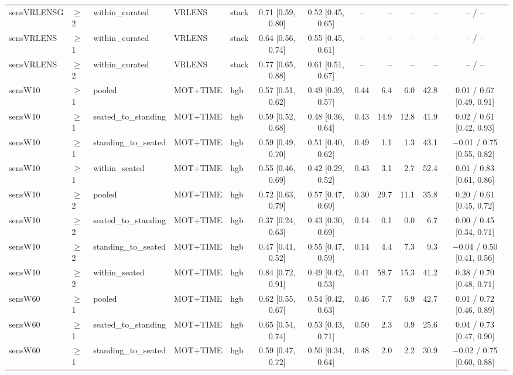 \begin{longtable}{@{}lllllcccrrrc@{}}
sensVRLENSG & $\geq$2 & within\_curated & VRLENS & stack & 0.71 [0.59, 0.80] & 0.52 [0.45, 0.65] & -- & -- & -- & -- & -- / -- \\
sensVRLENS & $\geq$1 & within\_curated & VRLENS & stack & 0.64 [0.56, 0.74] & 0.55 [0.45, 0.61] & -- & -- & -- & -- & -- / -- \\
sensVRLENS & $\geq$2 & within\_curated & VRLENS & stack & 0.77 [0.65, 0.88] & 0.61 [0.51, 0.67] & -- & -- & -- & -- & -- / -- \\
sensW10 & $\geq$1 & pooled & MOT+TIME & hgb & 0.57 [0.51, 0.62] & 0.49 [0.39, 0.57] & 0.44 & 6.4 & 6.0 & 42.8 & 0.01 / 0.67 [0.49, 0.91] \\
sensW10 & $\geq$1 & seated\_to\_standing & MOT+TIME & hgb & 0.59 [0.52, 0.68] & 0.48 [0.36, 0.64] & 0.43 & 14.9 & 12.8 & 41.9 & 0.02 / 0.61 [0.42, 0.93] \\
sensW10 & $\geq$1 & standing\_to\_seated & MOT+TIME & hgb & 0.59 [0.49, 0.70] & 0.51 [0.40, 0.62] & 0.49 & 1.1 & 1.3 & 43.1 & $-$0.01 / 0.75 [0.55, 0.82] \\
sensW10 & $\geq$1 & within\_seated & MOT+TIME & hgb & 0.55 [0.46, 0.69] & 0.42 [0.29, 0.52] & 0.43 & 3.1 & 2.7 & 52.4 & 0.01 / 0.83 [0.61, 0.86] \\
sensW10 & $\geq$2 & pooled & MOT+TIME & hgb & 0.72 [0.63, 0.79] & 0.57 [0.47, 0.69] & 0.30 & 29.7 & 11.1 & 35.8 & 0.20 / 0.61 [0.45, 0.72] \\
sensW10 & $\geq$2 & seated\_to\_standing & MOT+TIME & hgb & 0.37 [0.24, 0.63] & 0.43 [0.30, 0.69] & 0.14 & 0.1 & 0.0 & 6.7 & 0.00 / 0.45 [0.34, 0.71] \\
sensW10 & $\geq$2 & standing\_to\_seated & MOT+TIME & hgb & 0.47 [0.41, 0.52] & 0.55 [0.47, 0.59] & 0.14 & 4.4 & 7.3 & 9.3 & $-$0.04 / 0.50 [0.41, 0.56] \\
sensW10 & $\geq$2 & within\_seated & MOT+TIME & hgb & 0.84 [0.72, 0.91] & 0.49 [0.42, 0.53] & 0.41 & 58.7 & 15.3 & 41.2 & 0.38 / 0.70 [0.48, 0.71] \\
sensW60 & $\geq$1 & pooled & MOT+TIME & hgb & 0.62 [0.55, 0.67] & 0.54 [0.42, 0.63] & 0.46 & 7.7 & 6.9 & 42.7 & 0.01 / 0.72 [0.46, 0.89] \\
sensW60 & $\geq$1 & seated\_to\_standing & MOT+TIME & hgb & 0.65 [0.54, 0.74] & 0.53 [0.43, 0.71] & 0.50 & 2.3 & 0.9 & 25.6 & 0.04 / 0.73 [0.47, 0.90] \\
sensW60 & $\geq$1 & standing\_to\_seated & MOT+TIME & hgb & 0.59 [0.47, 0.72] & 0.50 [0.34, 0.64] & 0.48 & 2.0 & 2.2 & 30.9 & $-$0.02 / 0.75 [0.60, 0.88] \\

\end{longtable}
